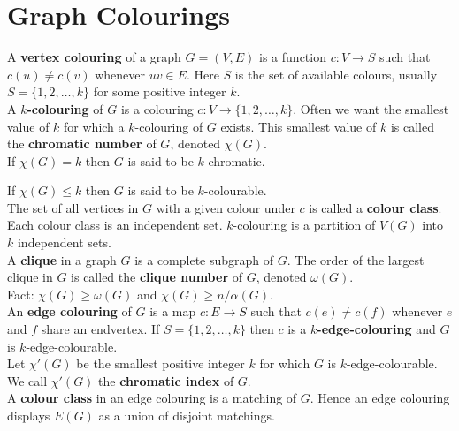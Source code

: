 \chapter{Graph Colourings}

A \textbf{vertex colouring} of a graph \(G = (V, E)\) is a function \(c: V \to S\) such that \(c(u) \neq c(v)\) whenever \(uv \in E\). Here \(S\) is the set of available colours, usually \(S = \{1, 2, \dots, k\}\) for some positive integer \(k\). \\

A \textbf{\(k\)-colouring} of \(G\) is a colouring \(c: V \to \{1, 2, \dots, k\}\). Often we want the smallest value of \(k\) for which a \(k\)-colouring of \(G\) exists. This smallest value of \(k\) is called the \textbf{chromatic number} of \(G\), denoted \(\chi(G)\). \\

If \(\chi(G) = k\) then \(G\) is said to be \(k\)-chromatic.

If \(\chi(G) \leq k\) then \(G\) is said to be \(k\)-colourable. \\

The set of all vertices in \(G\) with a given colour under \(c\) is called a \textbf{colour class}. Each colour class is an independent set. \(k\)-colouring is a partition of \(V(G)\) into \(k\) independent sets. \\

A \textbf{clique} in a graph \(G\) is a complete subgraph of \(G\). The order of the largest clique in \(G\) is called the \textbf{clique number} of \(G\), denoted \(\omega(G)\). \\

Fact: \(\chi(G) \geq \omega(G)\) and \(\chi(G) \geq n/\alpha(G)\). \\

An \textbf{edge colouring} of \(G\) is a map \(c : E \to S\) such that \(c(e) \neq c(f)\) whenever \(e\) and \(f\) share an endvertex. If \(S = \{1, 2, \dots, k\}\) then \(c\) is a \textbf{\(k\)-edge-colouring} and \(G\) is \(k\)-edge-colourable. \\

Let \(\chi'(G)\) be the smallest positive integer \(k\) for which \(G\) is \(k\)-edge-colourable. We call \(\chi'(G)\) the \textbf{chromatic index} of \(G\). \\

A \textbf{colour class} in an edge colouring is a matching of \(G\). Hence an edge colouring displays \(E(G)\) as a union of disjoint matchings. \\

